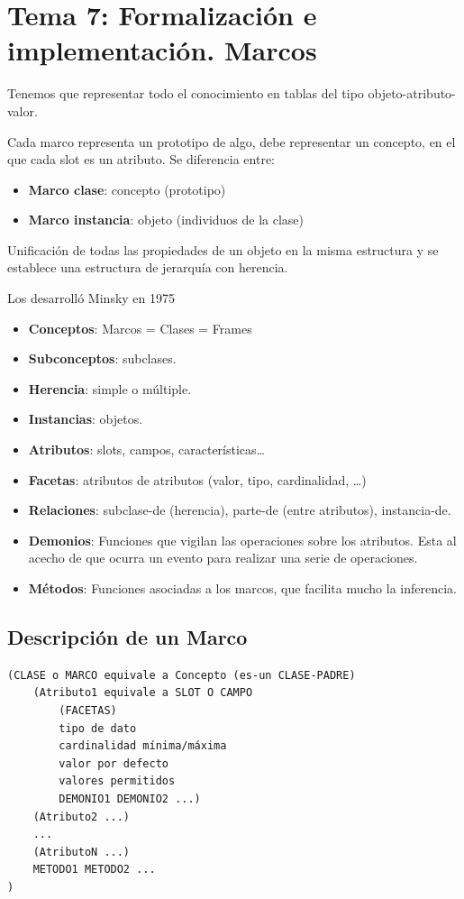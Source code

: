 \documentclass[12pt, twoside, openright]{report} %
\begin{document}
\chapter{Tema 7: Formalización e implementación. Marcos}
Tenemos que representar todo el conocimiento en tablas del tipo objeto-atributo-valor.

Cada marco representa un prototipo de algo, debe representar un concepto, en el que cada slot es un atributo. Se diferencia entre:
\begin{itemize}
	\item \textbf{Marco clase}: concepto (prototipo)
	\item \textbf{Marco instancia}: objeto (individuos de la clase)
\end{itemize}

Unificación de todas las propiedades de un objeto en la misma estructura y se establece una estructura de jerarquía con herencia.

Los desarrolló Minsky en 1975
\begin{itemize}
	\item \textbf{Conceptos}: Marcos = Clases = Frames
	\item \textbf{Subconceptos}: subclases.
	\item \textbf{Herencia}: simple o múltiple.
	\item \textbf{Instancias}: objetos.
	\item \textbf{Atributos}: slots, campos, características\dots
	\item \textbf{Facetas}: atributos de atributos (valor, tipo, cardinalidad, …)
	\item \textbf{Relaciones}: subclase-de (herencia), parte-de (entre atributos), instancia-de.
	\item \textbf{Demonios}: Funciones que vigilan las operaciones sobre los atributos. Esta al acecho de que ocurra un evento para realizar una serie de operaciones.
	\item \textbf{Métodos}: Funciones asociadas a los marcos, que facilita mucho la inferencia.
\end{itemize}
\pagebreak

\section{Descripción de un Marco}
\begin{lstlisting}
(CLASE o MARCO equivale a Concepto (es-un CLASE-PADRE)
	(Atributo1 equivale a SLOT O CAMPO
		(FACETAS) 
		tipo de dato
		cardinalidad mínima/máxima
		valor por defecto
		valores permitidos
		DEMONIO1 DEMONIO2 ...)
	(Atributo2 ...)
	...
	(AtributoN ...)
	METODO1 METODO2 ...
)	
\end{lstlisting}
\end{document}
